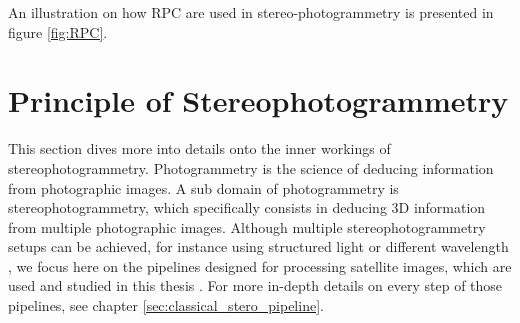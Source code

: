 An illustration on how RPC are used in stereo-photogrammetry is presented in figure \ref{fig:RPC}.

\section{Principle of Stereophotogrammetry}
This section dives more into details onto the inner workings of stereophotogrammetry. Photogrammetry is the science of deducing information from photographic images. A sub domain of photogrammetry is stereophotogrammetry, which specifically consists in deducing 3D information from multiple photographic images. Although multiple stereophotogrammetry setups can be achieved, for instance using structured light \cite{scharstein_high-accuracy_2003} or different wavelength \cite{geng_rainbow_1996}, we focus here on the pipelines designed for processing satellite images, which are used and studied in this thesis \cite{franchis_automatic_2014, shean_automated_2016, rupnik_micmac_2017, michel_new_2020}. For more in-depth details on every step of those pipelines, see chapter \ref{sec:classical_stero_pipeline}.

